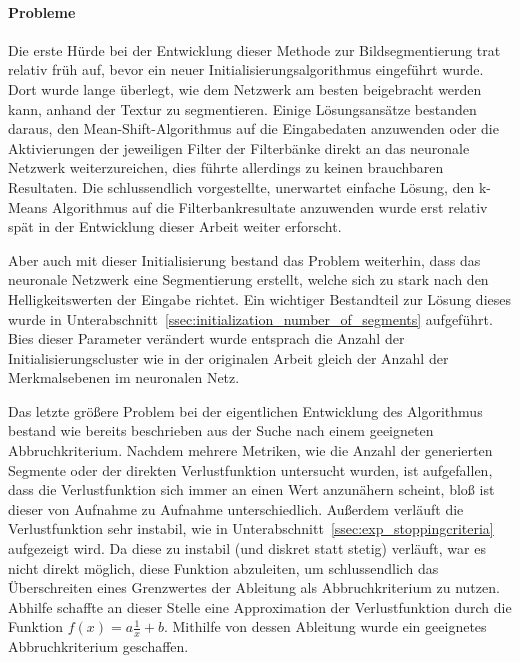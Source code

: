 \paragraph{Probleme} Die erste Hürde bei der Entwicklung dieser Methode zur Bildsegmentierung trat relativ früh auf, bevor ein neuer Initialisierungsalgorithmus eingeführt wurde. Dort wurde lange überlegt, wie dem Netzwerk am besten beigebracht werden kann, anhand der Textur zu segmentieren. Einige Lösungsansätze bestanden daraus, den Mean-Shift-Algorithmus auf die Eingabedaten anzuwenden oder die Aktivierungen der jeweiligen Filter der Filterbänke direkt an das neuronale Netzwerk weiterzureichen, dies führte allerdings zu keinen brauchbaren Resultaten. Die schlussendlich vorgestellte, unerwartet einfache Lösung, den k-Means Algorithmus auf die Filterbankresultate anzuwenden wurde erst relativ spät in der Entwicklung dieser Arbeit weiter erforscht.

Aber auch mit dieser Initialisierung bestand das Problem weiterhin, dass das neuronale Netzwerk eine Segmentierung erstellt, welche sich zu stark nach den Helligkeitswerten der Eingabe richtet. Ein wichtiger Bestandteil zur Lösung dieses wurde in Unterabschnitt~\ref{ssec:initialization_number_of_segments} aufgeführt. Bies dieser Parameter verändert wurde entsprach die Anzahl der Initialisierungscluster wie in der originalen Arbeit \cite{kanezaki_18} gleich der Anzahl der Merkmalsebenen im neuronalen Netz.

Das letzte größere Problem bei der eigentlichen Entwicklung des Algorithmus bestand wie bereits beschrieben aus der Suche nach einem geeigneten Abbruchkriterium. Nachdem mehrere Metriken, wie die Anzahl der generierten Segmente oder der direkten Verlustfunktion untersucht wurden, ist aufgefallen, dass die Verlustfunktion sich immer an einen Wert anzunähern scheint, bloß ist dieser von Aufnahme zu Aufnahme unterschiedlich. Außerdem verläuft die Verlustfunktion sehr instabil, wie in Unterabschnitt~\ref{ssec:exp_stoppingcriteria} aufgezeigt wird. Da diese zu instabil (und diskret statt stetig) verläuft, war es nicht direkt möglich, diese Funktion abzuleiten, um schlussendlich das Überschreiten eines Grenzwertes der Ableitung als Abbruchkriterium zu nutzen. Abhilfe schaffte an dieser Stelle eine Approximation der Verlustfunktion durch die Funktion $f(x)=a\frac{1}{x}+b$. Mithilfe von dessen Ableitung wurde ein geeignetes Abbruchkriterium geschaffen.

